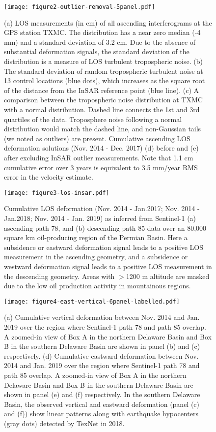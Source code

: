 \documentclass[draft]{agujournal2019}
\begin{document}
\begin{figure}[hbt!]
\centering
\texttt{[image: figure2-outlier-removal-5panel.pdf]}
\caption{(a) LOS measurements (in cm) of all ascending interferograms at the GPS station TXMC. The distribution has a near zero median (-4 mm) and a standard deviation of 3.2 cm. Due to the absence of substantial deformation signals, the standard deviation of the distribution is a measure of LOS turbulent tropospheric noise. (b) The standard deviation of random tropospheric turbulent noise at 13 control locations (blue dots), which increases as the square root of the distance from the InSAR reference point (blue line). (c) A comparison between the tropospheric noise distribution at TXMC with a normal distribution. Dashed line connects the 1st and 3rd quartiles of the data. Troposphere noise following a normal distribution would match the dashed line, and non-Gaussian tails (we noted as outliers) are present. Cumulative ascending LOS deformation solutions (Nov. 2014 - Dec. 2017) (d) before and (e) after excluding InSAR outlier measurements. Note that 1.1 cm cumulative error over 3 years is equivalent to 3.5 mm/year RMS error in the velocity estimate.}
\label{fig:outliers}
\end{figure}

\begin{figure*}[hbt!]
\centering
\texttt{[image: figure3-los-insar.pdf]}
\caption{Cumulative LOS deformation (Nov. 2014 - Jan.2017; Nov. 2014 - Jan.2018; Nov. 2014 - Jan. 2019) as inferred from Sentinel-1 (a) ascending path 78, and (b) descending path 85 data over an 80,000 square km oil-producing region of the Permian Basin. Here a subsidence or eastward deformation signal leads to a positive LOS measurement in the ascending geometry, and a subsidence or westward deformation signal leads to a positive LOS measurement in the descending geometry. Areas with $>$1200 m altitude are masked due to the low oil production activity in mountainous regions.}
\label{fig:insar-los}
\end{figure*}

\begin{figure}[hbt!]
\centering
\texttt{[image: figure4-east-vertical-6panel-labelled.pdf]}
\caption{(a) Cumulative vertical deformation between Nov. 2014 and Jan. 2019 over the region where Sentinel-1 path 78 and path 85 overlap. A zoomed-in view of Box A in the northern Delaware Basin and Box B in the southern Delaware Basin are shown in panel (b) and (c) respectively. (d) Cumulative eastward deformation between Nov. 2014 and Jan. 2019 over the region where Sentinel-1 path 78 and path 85 overlap. A zoomed-in view of Box A in the northern Delaware Basin and Box B in the southern Delaware Basin are shown in panel (e) and (f) respectively. In the southern Delaware Basin, the observed vertical and eastward deformation (panel (c) and (f)) show linear patterns along with earthquake hypocenters (gray dots) detected by TexNet in 2018.}
\label{fig:insar-decomp}
\end{figure}
\end{document}
